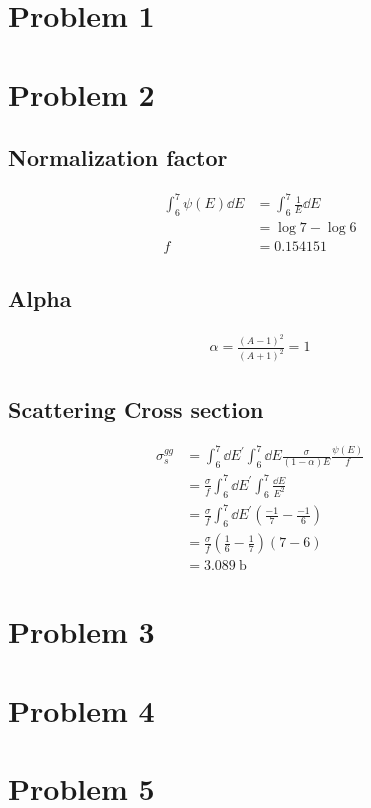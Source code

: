 \documentclass{article}
\begin{document}
\section{Problem 1}

\section{Problem 2}

\subsection{Normalization factor}

\begin{align*}
\int_6^7 \psi(E) \dd{E} &= \int_6^7 \frac{1}{E} \dd{E} \\
&= \log{7} - \log{6} \\
f &= 0.154151
\end{align*}

\subsection{Alpha}

\begin{align*}
\alpha = \frac{(A-1)^2}{(A+1)^2} = 1
\end{align*}

\subsection{Scattering Cross section}

\begin{align*}
\sigma_s^{gg} &= \int_6^7 \dd{E^\prime} \int_6^7 \dd{E} \frac{\sigma}{(1 - \alpha)E} \frac{\psi(E)}{f} \\
&= \frac{\sigma}{f} \int_6^7 \dd{E^\prime} \int_6^7 \frac{\dd{E}}{E^2} \\
&= \frac{\sigma}{f} \int_6^7 \dd{E^\prime} \left( \frac{-1}{7} - \frac{-1}{6} \right) \\
&= \frac{\sigma}{f} \left( \frac{1}{6} - \frac{1}{7} \right) \left( 7 - 6 \right) \\
&= \SI{3.089}{\barn}
\end{align*}

\section{Problem 3}

\section{Problem 4}

\section{Problem 5}
\end{document}

